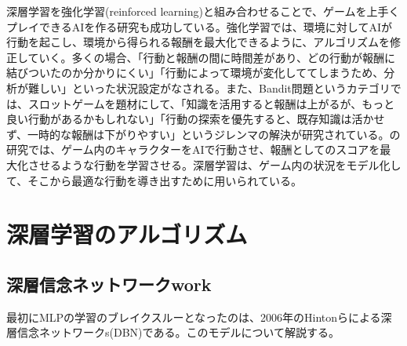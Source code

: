 深層学習を強化学習(reinforced learning)と組み合わせることで、ゲームを上手くプレイできるAIを作る研究も成功している\cite{mnih2013playing}。強化学習では、環境に対してAIが行動を起こし、環境から得られる報酬を最大化できるように、アルゴリズムを修正していく。多くの場合、「行動と報酬の間に時間差があり、どの行動が報酬に結びついたのか分かりにくい」「行動によって環境が変化しててしまうため、分析が難しい」といった状況設定がなされる。また、Bandit問題というカテゴリでは、スロットゲームを題材にして、「知識を活用すると報酬は上がるが、もっと良い行動があるかもしれない」「行動の探索を優先すると、既存知識は活かせず、一時的な報酬は下がりやすい」というジレンマの解決が研究されている\cite{cesa-bianchi2013a-gang}。\cite{mnih2013playing}の研究では、ゲーム内のキャラクターをAIで行動させ、報酬としてのスコアを最大化させるような行動を学習させる。深層学習は、ゲーム内の状況をモデル化して、そこから最適な行動を導き出すために用いられている。

\section{深層学習のアルゴリズム}
\subsection{深層信念ネットワークwork}
最初にMLPの学習のブレイクスルーとなったのは、2006年のHintonらによる深層信念ネットワークs(DBN)\cite{hinton2006a-fast, hinton2006reducing}である。このモデルについて解説する。
